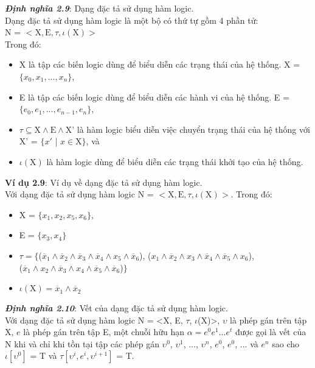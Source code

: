 \documentclass[a4paper,13pt,oneside,openany]{book}
\begin{document}
\begin{flushleft}
		\textbf{\textit{Định nghĩa 2.9}}: Dạng đặc tả sử dụng hàm logic.\\
		Dạng đặc tả sử dụng hàm logic là một bộ có thứ tự gồm 4 phần tử:\\
		N = $<\textrm{X}, \textrm{E}, \tau, \iota(\textrm{X})>$\\
		Trong đó:\\
		\begin{itemize}
			\item X là tập các biến logic dùng để biểu diễn các trạng thái của hệ thống. X = $\{x_0, x_1, ..., x_n\}$,
			\item E là tập các biến logic dùng để biểu diễn các hành vi của hệ thống. E = $\{e_0, e_1, ..., e_{n-1}, e_n\}$,
			\item $\tau \subseteq \textrm{X} \land \textrm{E} \land \textrm{X'}$ là hàm logic biểu diễn việc chuyển trạng thái của hệ thống với X' = $\{x'$ | $x \in \textrm{X}\}$, và
			\item $\iota(\textrm{X})$ là hàm logic dùng để biểu diễn các trạng thái khởi tạo của hệ thống.
		\end{itemize}
		\textbf{Ví dụ 2.9}: Ví dụ về dạng đặc tả sử dụng hàm logic.\\
		Với dạng đặc tả sử dụng hàm logic N = $<\textrm{X}, \textrm{E}, \tau, \iota(\textrm{X})>$. Trong đó:\\
		\begin{itemize}
			\item X = $\{x_1, x_2, x_5, x_6\}$,
			\item E = $\{x_3, x_4\}$
			\item $\tau = \{$($\overline{x}_1 \land \overline{x}_2 \land \overline{x}_3 \land \overline{x}_4 \land x_5 \land \overline{x}_6$), ($x_1\land\overline{x}_2\land x_3\land \overline{x}_4\land \overline{x}_5 \land x_6$),\\
			($\overline{x}_1\land x_2\land\overline{x}_3\land x_4\land \overline{x}_5\land\overline{x}_6$)$\}$
			\item $\iota(\textrm{X}) = \overline{x}_1 \land \overline{x}_2$
		\end{itemize}
		\textbf{\textit{Định nghĩa 2.10}}: Vết của dạng đặc tả sử dụng hàm logic.\\
		Với dạng đặc tả sử dụng hàm logic N = <X, E, $\tau$, $\iota$(X)>, $\upsilon$ là phép gán trên tập X, $e$ là phép gán trên tập E, một chuỗi hữu hạn $\alpha = e^0e^1...e^t$ được gọi là vết của N khi và chỉ khi tồn tại tập các phép gán $\upsilon^0$, $\upsilon^1$, ..., $\upsilon^n$, $e^0$, $e^0$, ... và $e^n$ sao cho $\iota[\upsilon^0]$ = T và $\tau[\upsilon^i, e^i, \upsilon^{i+1}]$ = T.\\

\end{flushleft}
\end{document}
